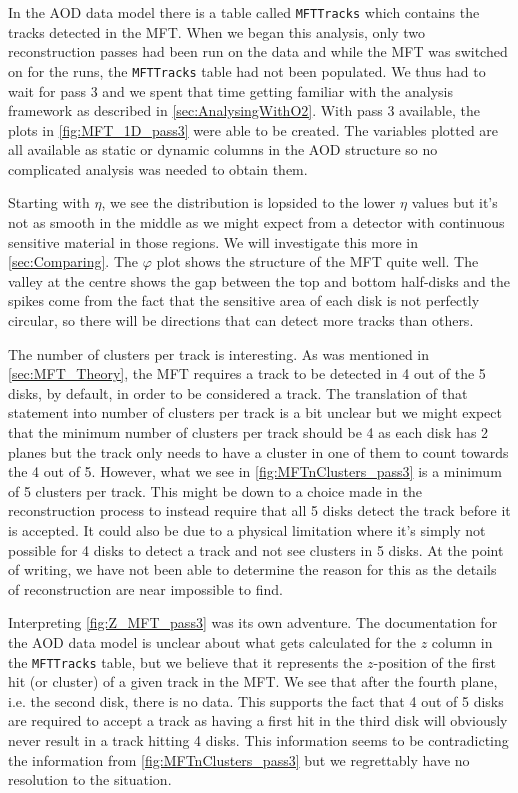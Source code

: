 In the AOD data model there is a table called \texttt{MFTTracks} which contains the tracks detected in the MFT. When we began this analysis, only two reconstruction passes had been run on the data and while the MFT was switched on for the runs, the \texttt{MFTTracks} table had not been populated. We thus had to wait for pass 3 and we spent that time getting familiar with the analysis framework as described in \cref{sec:AnalysingWithO2}. With pass 3 available, the plots in \cref{fig:MFT_1D_pass3} were able to be created. The variables plotted are all available as static or dynamic columns in the AOD structure so no complicated analysis was needed to obtain them. 

Starting with $\eta$, we see the distribution is lopsided to the lower $\eta$ values but it's not as smooth in the middle as we might expect from a detector with continuous sensitive material in those regions. We will investigate this more in \cref{sec:Comparing}. The $\varphi$ plot shows the structure of the MFT quite well. The valley at the centre shows the gap between the top and bottom half-disks and the spikes come from the fact that the sensitive area of each disk is not perfectly circular, so there will be directions that can detect more tracks than others. 

The number of clusters per track is interesting. As was mentioned in \cref{sec:MFT_Theory}, the MFT requires a track to be detected in 4 out of the 5 disks, by default, in order to be considered a track. The translation of that statement into number of clusters per track is a bit unclear but we might expect that the minimum number of clusters per track should be 4 as each disk has 2 planes but the track only needs to have a cluster in one of them to count towards the 4 out of 5. However, what we see in \cref{fig:MFTnClusters_pass3} is a minimum of 5 clusters per track. This might be down to a choice made in the reconstruction process to instead require that all 5 disks detect the track before it is accepted. It could also be due to a physical limitation where it's simply not possible for 4 disks to detect a track and not see clusters in 5 disks. At the point of writing, we have not been able to determine the reason for this as the details of reconstruction are near impossible to find.

Interpreting \cref{fig:Z_MFT_pass3} was its own adventure. The documentation for the AOD data model is unclear about what gets calculated for the $z$ column in the \texttt{MFTTracks} table, but we believe that it represents the $z$-position of the first hit (or cluster) of a given track in the MFT. We see that after the fourth plane, i.e. the second disk, there is no data. This supports the fact that 4 out of 5 disks are required to accept a track as having a first hit in the third disk will obviously never result in a track hitting 4 disks. This information seems to be contradicting the information from \cref{fig:MFTnClusters_pass3} but we regrettably have no resolution to the situation.

